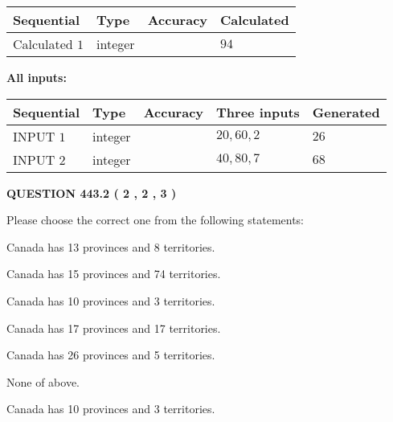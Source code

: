 \documentclass[12pt]{article}
\begin{document}
   
  
  
\noindent\begin{tabular}{|l|l|l|l|}
\hline
 Sequential & Type & Accuracy & Calculated \\ 
\hline
 
 
  Calculated $  1 $ & integer &  & 
  $ 94 $ 
 \\  \hline  
 \end{tabular}
   
   
   
   
\noindent\vspace{0.1in}\hspace{-0.08in} {\textbf{\Large{All inputs: }}}
   
   
  
  
\noindent\begin{tabular}{|l|l|l|l|l|}
\hline
 Sequential & Type & Accuracy & Three inputs & Generated \\ 
\hline
 
 
  INPUT $  1 $ & integer &  & $
 20
 , 
 60
 , 
 2
 $ & $ 26 $ 
 \\  \hline  
 
 
  INPUT $  2 $ & integer &  & $
 40
 , 
 80
 , 
 7
 $ & $ 68 $ 
 \\  \hline  
 \end{tabular}
   
   
  
\vspace{0.2in}
  
{\textbf{\Large{QUESTION
443.2 
 ( 2 , 2 , 3 )
}}}
  
  
Please choose the correct one from the following statements:
 
 
Canada has  13 provinces and  8 territories.
 
 
Canada has  15 provinces and  74 territories.
 
 
Canada has 10  provinces and 3 territories.
 
 
Canada has  17 provinces and  17 territories.
 
 
Canada has  26 provinces and  5 territories.
 
 
 None of above.
 
 
\noindent{}
 
 
Canada has 10  provinces and 3 territories.
 
\end{document}
